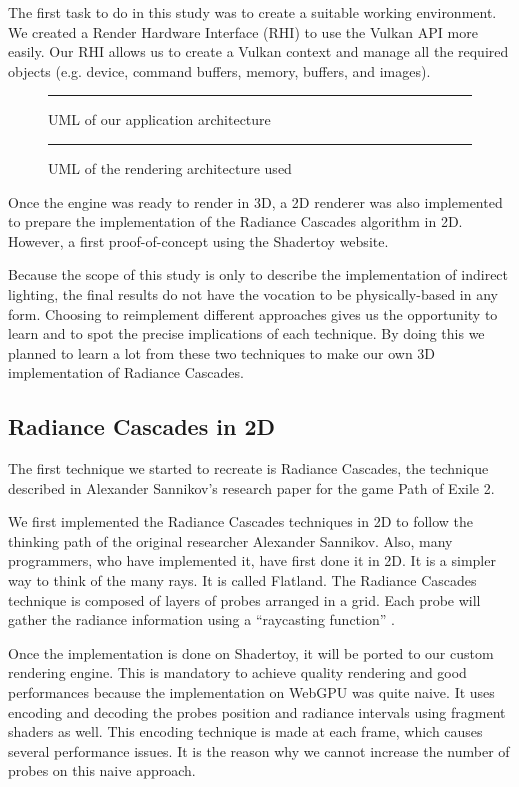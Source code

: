 \documentclass{rapportCS}
\begin{document}
The first task to do in this study was to create a suitable working environment. We created a Render Hardware Interface (RHI) to use the Vulkan API more easily. Our RHI allows us to create a Vulkan context and manage all the required objects (e.g. device, command buffers, memory, buffers, and images).

\begin{figure}
\centering
\rule{1cm}{1cm}
\caption{UML of our application architecture}
\end{figure}

\begin{figure}
\centering
\rule{1cm}{1cm}
\caption{UML of the rendering architecture used}
\end{figure}

Once the engine was ready to render in 3D, a 2D renderer was also implemented to prepare the implementation of the Radiance Cascades algorithm in 2D. However, a first proof-of-concept using the Shadertoy website.

Because the scope of this study is only to describe the implementation of indirect lighting, the final results do not have the vocation to be physically-based in any form.
Choosing to reimplement different approaches gives us the opportunity to learn and to spot the precise implications of each technique. By doing this we planned to learn a lot from these two techniques to make our own 3D implementation of Radiance Cascades.


\subsection{Radiance Cascades in 2D}
The first technique we started to recreate is Radiance Cascades, the technique described in Alexander Sannikov’s research paper for the game Path of Exile 2.

We first implemented the Radiance Cascades techniques in 2D to follow the thinking path of the original researcher Alexander Sannikov. Also, many programmers, who have implemented it, have first done it in 2D. It is a simpler way to think of the many rays. It is called Flatland.
The Radiance Cascades technique is composed of layers of probes arranged in a grid. Each probe will gather the radiance information using a “raycasting function” \cite{}.

Once the implementation is done on Shadertoy, it will be ported to our custom rendering engine. This is mandatory to achieve quality rendering and good performances because the implementation on WebGPU was quite naive. It uses encoding and decoding the probes position and radiance intervals using fragment shaders as well. This encoding technique is made at each frame, which causes several performance issues. It is the reason why we cannot increase the number of probes on this naive approach.
\end{document}
